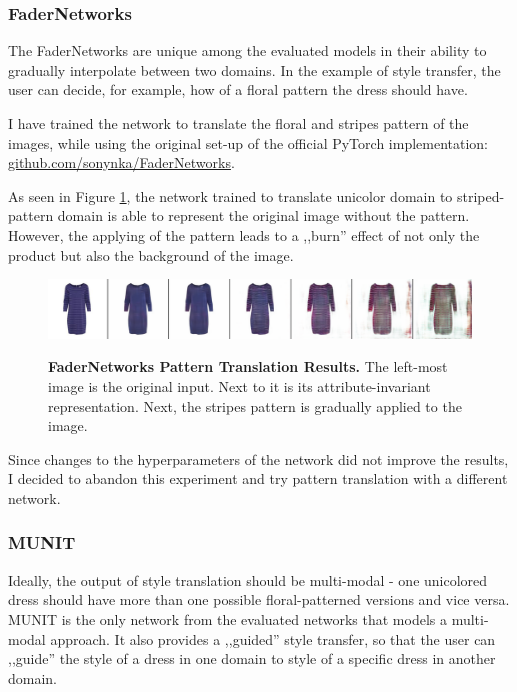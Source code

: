\documentclass[12pt]{report}
\begin{document}
\subsubsection{FaderNetworks}
The FaderNetworks are unique among the evaluated models in their ability to gradually interpolate between two domains. In the example of style transfer, the user can decide, for example, how of a floral pattern the dress should have.

I have trained the network to translate the floral and stripes pattern of the images, while using the original set-up of the official PyTorch implementation: \linebreak \hyperlink{https://github.com/sonynka/FaderNetworks}{github.com/sonynka/FaderNetworks}.

As seen in Figure \ref{fig:fader_results}, the network trained to translate unicolor domain to striped-pattern domain is able to represent the original image without the pattern. However, the applying of the pattern leads to a ,,burn'' effect of not only the product but also the background of the image.

\begin{figure}[h]
\centering
{\includegraphics[width=\linewidth]{04_experiments/fader}}
\caption{\label{fig:fader_results} \textbf{FaderNetworks Pattern Translation Results.} The left-most image is the original input. Next to it is its attribute-invariant representation. Next, the stripes pattern is gradually applied to the image.}
\end{figure}

Since changes to the hyperparameters of the network did not improve the results, I decided to abandon this experiment and try pattern translation with a different network.

\pagebreak
\subsubsection{MUNIT}
Ideally, the output of style translation should be multi-modal - one unicolored dress should have more than one possible floral-patterned versions and vice versa. MUNIT is the only network from the evaluated networks that models a multi-modal approach. It also provides a ,,guided'' style transfer, so that the user can ,,guide'' the style of a dress in one domain to style of a specific dress in another domain.
\end{document}

